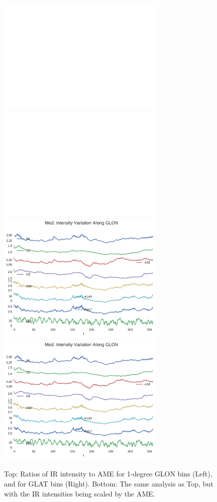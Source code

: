 \documentclass[preprint2,longabstract]{aastex}
\begin{document}
      \begin{figure}
        \label{fig:IRvsAMEbyGLOTandGLON}
        \includegraphics[width=80mm]{../Plots/IRPhotvsAMEbyGLAT.pdf}
        \includegraphics[width=80mm]{../Plots/IRPhotvsAMEbyGLON.pdf}
        \includegraphics[width=80mm]{../Plots/IR_AME_Ratio_byGLAT.pdf}
        \includegraphics[width=80mm]{../Plots/IR_AME_Ratio_byGLON.pdf}
        \centering
        \caption{Top: Ratios of IR intensity to AME for 1-degree GLON bins (Left), and for GLAT bins (Right). Bottom: The same analysis as Top, but with the IR intensities being scaled by the AME.}
      \end{figure}
\end{document}
